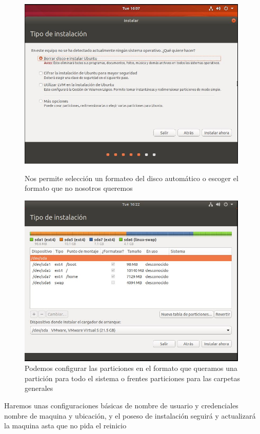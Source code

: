 \documentclass[preprint,11pt]{elsarticle}
\begin{document}
\begin{figure}[!htbp]
    \begin{center}
        \includegraphics[width=11cm]{ubuntu3.JPG}
    \end{center}
    \caption{Nos permite selección un formateo del disco automático o escoger el formato que no nosotros queremos}
    \begin{center}
        \includegraphics[width=11cm]{ubuntu4.JPG}
    \end{center}
    \caption{Podemos configurar las particiones en el formato que queramos una partición para todo el sistema o frentes particiones para las carpetas generales}
\end{figure}

Haremos unas configuraciones básicas de nombre de usuario y credenciales nombre de maquina y ubicación, y el poseso de instalación seguirá y actualizará la maquina asta que no pida el reinicio
\end{document}
